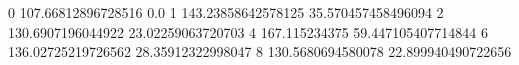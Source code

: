 0 107.66812896728516 0.0
1 143.23858642578125 35.570457458496094
2 130.6907196044922 23.02259063720703
4 167.115234375 59.447105407714844
6 136.02725219726562 28.35912322998047
8 130.5680694580078 22.899940490722656
